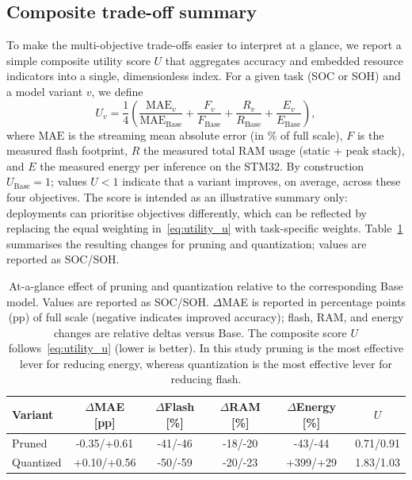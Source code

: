\documentclass[review]{elsarticle}
\begin{document}
\subsection{Composite trade-off summary}
To make the multi-objective trade-offs easier to interpret at a glance, we report a simple composite utility score $U$ that aggregates accuracy and embedded resource indicators into a single, dimensionless index. For a given task (SOC or SOH) and a model variant $v$, we define
\begin{equation}
\label{eq:utility_u}
U_v = \frac{1}{4}\left(
\frac{\mathrm{MAE}_v}{\mathrm{MAE}_{\mathrm{Base}}} +
\frac{F_v}{F_{\mathrm{Base}}} +
\frac{R_v}{R_{\mathrm{Base}}} +
\frac{E_v}{E_{\mathrm{Base}}}
\right),
\end{equation}
where $\mathrm{MAE}$ is the streaming mean absolute error (in \% of full scale), $F$ is the measured flash footprint, $R$ the measured total RAM usage (static + peak stack), and $E$ the measured energy per inference on the STM32. By construction $U_{\mathrm{Base}}=1$; values $U<1$ indicate that a variant improves, on average, across these four objectives. The score is intended as an illustrative summary only: deployments can prioritise objectives differently, which can be reflected by replacing the equal weighting in~\eqref{eq:utility_u} with task-specific weights.
Table~\ref{tab:tradeoff_summary} summarises the resulting changes for pruning and quantization; values are reported as SOC/SOH.
\begin{table}[tbp]
    \centering
    \caption[Summary of pruning/quantization effects]{At-a-glance effect of pruning and quantization relative to the corresponding Base model. Values are reported as SOC/SOH. $\Delta$MAE is reported in percentage points (pp) of full scale (negative indicates improved accuracy); flash, RAM, and energy changes are relative deltas versus Base. The composite score $U$ follows~\eqref{eq:utility_u} (lower is better). In this study pruning is the most effective lever for reducing energy, whereas quantization is the most effective lever for reducing flash.}
    \label{tab:tradeoff_summary}
    \scriptsize
    \setlength{\tabcolsep}{2.5pt}
    \renewcommand{\arraystretch}{1.05}
    \begin{tabular}{lccccc}
        \toprule
        Variant & $\Delta$MAE [pp] & $\Delta$Flash [\%] & $\Delta$RAM [\%] & $\Delta$Energy [\%] & $U$ \\
        \midrule
        Pruned & \textcolor{mgGreen}{-0.35}/\textcolor{mgRed}{+0.61} & \textcolor{mgGreen}{-41}/\textcolor{mgGreen}{-46} & \textcolor{mgGreen}{-18}/\textcolor{mgGreen}{-20} & \textcolor{mgGreen}{-43}/\textcolor{mgGreen}{-44} & 0.71/0.91 \\
        Quantized & \textcolor{mgRed}{+0.10}/\textcolor{mgRed}{+0.56} & \textcolor{mgGreen}{-50}/\textcolor{mgGreen}{-59} & \textcolor{mgGreen}{-20}/\textcolor{mgGreen}{-23} & \textcolor{mgRed}{+399}/\textcolor{mgRed}{+29} & 1.83/1.03 \\
        \bottomrule
    \end{tabular}
\end{table}
\end{document}
